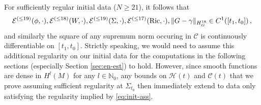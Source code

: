\documentclass[11pt,leqno,textwidth=10cm]{amsart}
\numberwithin{equation}{section}
\theoremstyle{definition}
\theoremstyle{plain}
\newcommand{\1}{\mathbbm{1}}
\newcommand{\E}{\mathcal{E}}
\newcommand{\N}{\mathbb{N}}
\newcommand{\Ric}{\text{\normalfont{Ric}}}
\renewcommand{\epsilon}{\varepsilon}
\newcommand{\change}[1]{\color{black}#1\color{black}}
\begin{document}
\change{For sufficiently regular initial data ($N\geq 21$), it follows that
\[\E^{(\leq 19)}(\phi,\cdot),\E^{(\leq 18)}(W,\cdot),\E^{(\leq 19)}(\Sigma,\cdot),\E^{(\leq 17)}(\Ric,\cdot),\|G-\gamma\|_{H^{18}_G}\in C^{1}([t_1,t_0])\,,\]
and similarly the square of any supremum norm occuring in $\mathcal{C}$ is continuously differentiable on $[t_1,t_0]$. Strictly speaking, we would need to assume this additional regularity on our initial data for the computations in the following sections (especially Section \ref{sec:en-est}) to hold. However, since smooth functions are dense in $H^l(M)$ for any $l\in\N_0$, any bounds on $\mathcal{H}(t)$ and $\mathcal{C}(t)$ that we prove assuming sufficient regularity at $\Sigma_{t_0}$ then immediately extend to data only satisfying the regularity implied by \eqref{eq:init-ass}. }
\end{document}
